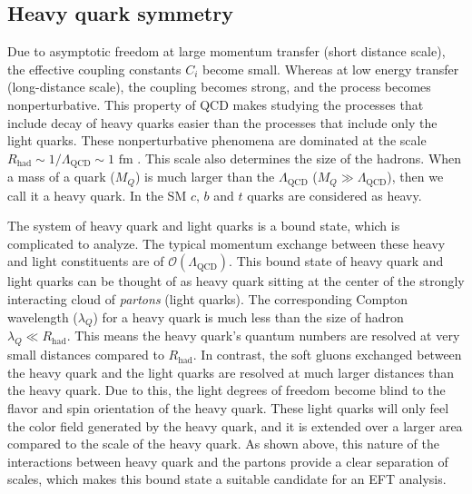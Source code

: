 \subsection{Heavy quark symmetry}\label{sec:heavy_quark_sym}
Due to asymptotic freedom \cite{Gross:1973id} at large momentum transfer (short distance scale), the effective coupling constants $C_i$ become small. Whereas at low energy transfer (long-distance scale), the coupling becomes strong, and the process becomes nonperturbative. This property of QCD makes studying the processes that include decay of heavy quarks easier than the processes that include only the light quarks. These nonperturbative phenomena are dominated at the scale $R_{\text{had}}\sim 1/\Lambda_{\text{QCD}}\sim 1\text{ fm}$ \cite{Neubert:1997gu}. This scale also determines the size of the hadrons. When a mass of a quark ($M_Q$) is much larger than the $\Lambda_{\text{QCD}}$ ($M_Q\gg\Lambda_{\text{QCD}}$), then we call it a heavy quark. In the SM $c,\,b$ and $t$ quarks are considered as heavy.\par
The system of heavy quark and light quarks is a bound state, which is complicated to analyze. The typical momentum exchange between these heavy and light constituents are of $\mathcal{O}(\Lambda_{\text{QCD}})$. This bound state of heavy quark and light quarks can be thought of as heavy quark sitting at the center of the strongly interacting cloud of  \textit{partons} (light quarks). The corresponding Compton wavelength ($\lambda_Q$) for a heavy quark is much less than the size of hadron $\lambda_Q\ll R_{\text{had}}$. This means the heavy quark's quantum numbers are resolved at very small distances compared to $R_{\text{had}}$. In contrast, the soft gluons exchanged between the heavy quark and the light quarks are resolved at much larger distances than the heavy quark. Due to this, the light degrees of freedom become blind to the flavor and spin orientation of the heavy quark. These light quarks will only feel the color field generated by the heavy quark, and it is extended over a larger area compared to the scale of the heavy quark. As shown above, this nature of the interactions between heavy quark and the partons provide a clear separation of scales, which makes this bound state a suitable candidate for an EFT analysis.\par 
